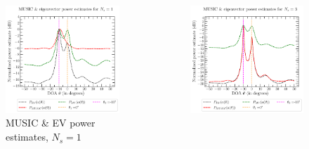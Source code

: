 \documentclass[UKenglish,8pt,aspectratio=1610]{beamer}
\begin{document}
\begin{frame}
\begin{columns}
\begin{column}{0.33\textwidth}
\begin{figure}[h!]
	\includegraphics[scale=0.3]{question7/part_A_question_7_number_of_sources_+Ns=1.pdf}
		\caption{MUSIC \& EV power estimates, $N_s=1$}
\end{figure}
	\end{column}
\begin{column}{0.33\textwidth}
	\begin{figure}[h!]
		\vspace{-15pt}
		\centering
		\includegraphics[scale=0.3]{question7/part_A_question_7_number_of_sources_+Ns=3.pdf}

\end{figure}
\end{column}
\end{columns}
\end{frame}
\end{document}
